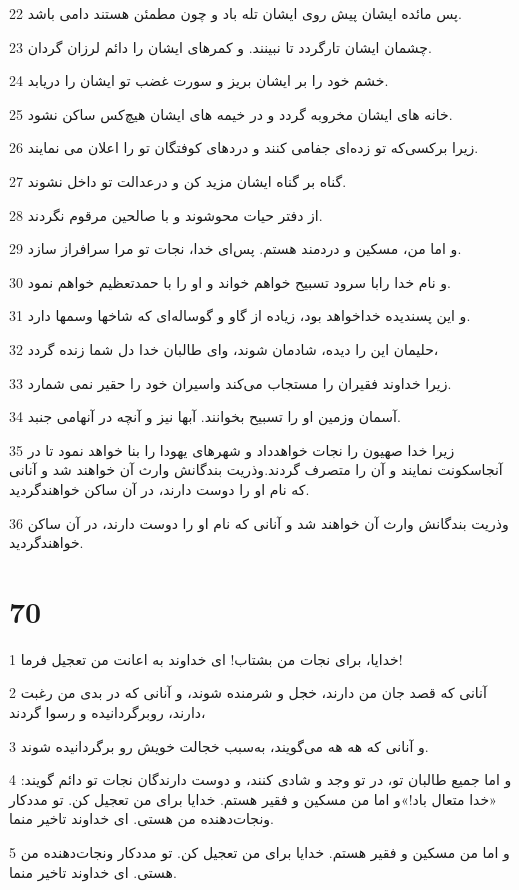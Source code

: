 \par 22 پس مائده ایشان پیش روی ایشان تله باد و چون مطمئن هستند دامی باشد.
\par 23 چشمان ایشان تارگردد تا نبینند. و کمرهای ایشان را دائم لرزان گردان.
\par 24 خشم خود را بر ایشان بریز و سورت غضب تو ایشان را دریابد.
\par 25 خانه های ایشان مخروبه گردد و در خیمه های ایشان هیچ‌کس ساکن نشود.
\par 26 زیرا برکسی‌که تو زده‌ای جفامی کنند و دردهای کوفتگان تو را اعلان می نمایند.
\par 27 گناه بر گناه ایشان مزید کن و درعدالت تو داخل نشوند.
\par 28 از دفتر حیات محوشوند و با صالحین مرقوم نگردند.
\par 29 و اما من، مسکین و دردمند هستم. پس‌ای خدا، نجات تو مرا سرافراز سازد.
\par 30 و نام خدا رابا سرود تسبیح خواهم خواند و او را با حمدتعظیم خواهم نمود.
\par 31 و این پسندیده خداخواهد بود، زیاده از گاو و گوساله‌ای که شاخها وسمها دارد.
\par 32 حلیمان این را دیده، شادمان شوند، و‌ای طالبان خدا دل شما زنده گردد،
\par 33 زیرا خداوند فقیران را مستجاب می‌کند واسیران خود را حقیر نمی شمارد.
\par 34 آسمان وزمین او را تسبیح بخوانند. آبها نیز و آنچه در آنهامی جنبد.
\par 35 زیرا خدا صهیون را نجات خواهدداد و شهرهای یهودا را بنا خواهد نمود تا در آنجاسکونت نمایند و آن را متصرف گردند.وذریت بندگانش وارث آن خواهند شد و آنانی که نام او را دوست دارند، در آن ساکن خواهندگردید.
\par 36 وذریت بندگانش وارث آن خواهند شد و آنانی که نام او را دوست دارند، در آن ساکن خواهندگردید.
 
\chapter{70}

\par 1 خدایا، برای نجات من بشتاب! ای خداوند به اعانت من تعجیل فرما!
\par 2 آنانی که قصد جان من دارند، خجل و شرمنده شوند، و آنانی که در بدی من رغبت دارند، روبرگردانیده و رسوا گردند،
\par 3 و آنانی که هه هه می‌گویند، به‌سبب خجالت خویش رو برگردانیده شوند.
\par 4 و اما جمیع طالبان تو، در تو وجد و شادی کنند، و دوست دارندگان نجات تو دائم گویند: «خدا متعال باد!»و اما من مسکین و فقیر هستم. خدایا برای من تعجیل کن. تو مددکار ونجات‌دهنده من هستی. ای خداوند تاخیر منما.
\par 5 و اما من مسکین و فقیر هستم. خدایا برای من تعجیل کن. تو مددکار ونجات‌دهنده من هستی. ای خداوند تاخیر منما.
 
